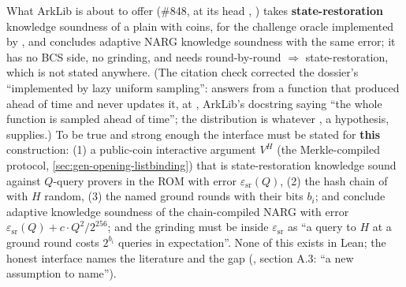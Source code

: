 \begin{sloppypar}
What ArkLib is about to offer (\#848,  at its head ,
) takes \textbf{state-restoration} knowledge
soundness of a plain  with coins, for the challenge oracle
 implemented by , and
concludes adaptive NARG knowledge soundness with the same error;
it has no BCS side, no grinding, and needs round-by-round $⇒$ state-restoration, which is not stated
anywhere. (The citation check corrected the dossier's ``implemented by lazy uniform sampling'':
 answers from a function that  produced ahead of time and
never updates it,  at , ArkLib's docstring
saying ``the whole function is sampled ahead of time''; the distribution is whatever , a
hypothesis, supplies.) To be true and strong enough the interface must be stated for \textbf{this} construction:
(1) a public-coin interactive argument $V^H$ (the Merkle-compiled protocol,
\cref{sec:gen-opening-listbinding}) that is state-restoration knowledge sound against $Q$-query
provers in the ROM with error $ε_{\mathrm{sr}}(Q)$, (2) the hash chain of  with $H$
random, (3) the named ground rounds with their bits $b_i$; and conclude adaptive knowledge soundness
of the chain-compiled NARG with error $ε_{\mathrm{sr}}(Q) + c·Q^2/2^{256}$; and the grinding must be
inside $ε_{\mathrm{sr}}$ as ``a query to $H$ at a ground round costs $2^{b_i}$ queries in
expectation''. None of this exists in Lean; the honest interface names the literature and the gap
(, section A.3: ``a new assumption to name'').
\end{sloppypar}

